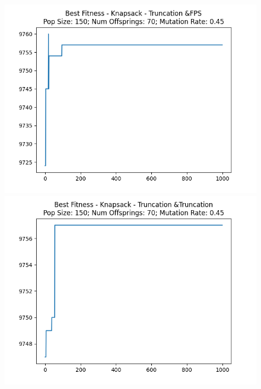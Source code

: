 \documentclass[12pt]{report}
\theoremstyle{mytheoremstyle}
\theoremstyle{mytheoremstyle}
\theoremstyle{myproblemstyle}
\begin{document}
\begin{figure}[!]
\begin{minipage}{0.4\textwidth}
		\includegraphics[width=\linewidth]{../Analysis/BSF_Knapsack_3_0_150_70.png}
	\end{minipage}
	\hspace{\fill}
	\begin{minipage}{0.4\textwidth}
		\includegraphics[width=\linewidth]{../Analysis/BSF_Knapsack_3_3_150_70.png}
	\end{minipage}
	\vspace*{1cm}
	\begin{minipage}{0.4\textwidth}

\end{minipage}
\end{figure}
\end{document}
